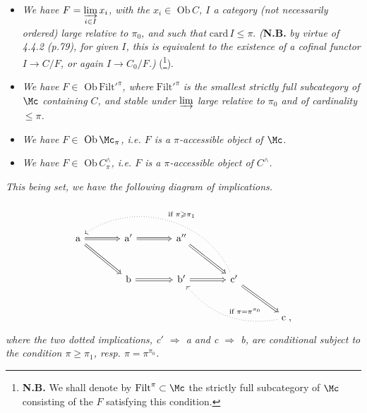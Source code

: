
\begin{itemize}[leftmargin=4em]
\item[\textit{b)}] \textit{We have $F = \varinjlim\limits_{i \in I} x_i$, with the $x_i \in$} $\mathrm{Ob}\, C$\textit{, $I$ a category (not necessarily ordered) large relative to $\pi_0$, and such that} $\mathrm{card}\, I \leqslant \pi$. \textit{(}\textbf{N.B.} \textit{by virtue of 4.4.2 (p.79), for given $I$, this is equivalent to the existence of a cofinal functor $I \longrightarrow C/F$, or again $I \longrightarrow C_0/F$.)} (\footnote[66]{\textbf{N.B.} We shall denote by $\mathrm{Filt}^{\pi} \subset \Mc$ the strictly full subcategory of $\Mc$ consisting of the $F$ satisfying this condition.}).
\item[\textit{b$'$)}] \textit{We have $F \in$} $\mathrm{Ob}\,\mathrm{Filt}'^{\pi}$\textit{, where} $\mathrm{Filt}'^{\pi}$ \textit{is the smallest strictly full subcategory of $\Mc$ containing $C$, and stable under $\varinjlim$ large relative to $\pi_0$ and of cardinality $\leqslant \pi$.}
\item[\textit{c)}] \textit{We have $F \in$} $\mathrm{Ob}\,\Mc_{\pi}$\textit{, i.e. $F$ is a $\pi$-accessible object of $\Mc$.}
\item[\textit{c$'$)}] \textit{We have $F \in$} $\mathrm{Ob}\, C^{\wedge}_{\pi}$\textit{, i.e. $F$ is a $\pi$-accessible object of $C^{\wedge}$.}
\end{itemize}
\textit{This being set, we have the following diagram of implications.}
\[
\begin{tikzcd}[column sep=large, row sep=large]
\mathrm{a} \arrow[r, Rightarrow] \arrow[dr, Rightarrow] & \mathrm{a}' \arrow[r, Rightarrow] & \mathrm{a}'' \arrow[dr, Rightarrow] & & \\
& \mathrm{b} \arrow[r, Rightarrow] & \mathrm{b}' \arrow[r, Rightarrow] & \mathrm{c}' \arrow[dr, Rightarrow] \arrow[ulll, dotted, bend right=50, "\text{if } \pi \geqslant \pi_1"'] & \\
& & & & \mathrm{c}\;, \arrow[ull, dotted, bend left=30, "\text{if } \pi = \pi^{\pi_0}"']
\end{tikzcd}
\]
\textit{where the two dotted implications, c$'$ $\Longrightarrow$ a and c $\Longrightarrow$ b, are conditional subject to the condition $\pi \geqslant \pi_1$, resp. $\pi = \pi^{\pi_0}$.}


